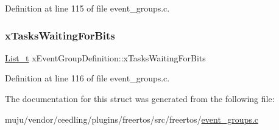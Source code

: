 Definition at line 115 of file event\+\_\+groups.\+c.

\mbox{\label{structx_event_group_definition_a6570ba98d93dcba9cb03de0c62df9044}} 
\subsubsection{\texorpdfstring{x\+Tasks\+Waiting\+For\+Bits}{xTasksWaitingForBits}}
{\footnotesize\ttfamily \hyperlink{externals_2freertos_2include_2list_8h_afd590ef6400071b4d63d65ef90bea7f4}{List\+\_\+t} x\+Event\+Group\+Definition\+::x\+Tasks\+Waiting\+For\+Bits}



Definition at line 116 of file event\+\_\+groups.\+c.



The documentation for this struct was generated from the following file\+:\begin{DoxyCompactItemize}
\item 
muju/vendor/ceedling/plugins/freertos/src/freertos/\hyperlink{vendor_2ceedling_2plugins_2freertos_2src_2freertos_2event__groups_8c}{event\+\_\+groups.\+c}\end{DoxyCompactItemize}
